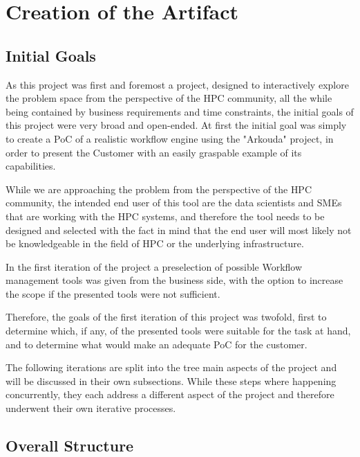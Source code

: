 \chapter{Creation of the Artifact}
\label{creation_of_the_artifact}

\section{Initial Goals}
\label{artefact_inital_goals}

As this project was first and foremost a project, designed to interactively explore the problem space from the perspective of the \ac{HPC} community, 
all the while being contained by business requirements and time constraints, the initial goals of this project were very broad and open-ended. 
At first the initial goal was simply to create a \ac{PoC} of a realistic workflow engine using the "Arkouda" project,
in order to present the Customer with an easily graspable example of its capabilities.

While we are approaching the problem from the perspective of the \ac{HPC} community, the intended end user of this tool are the data scientists and \acp{SME}
that are working with the \ac{HPC} systems, and therefore the tool needs to be designed and selected with the fact in mind that the end user will most likely not be knowledgeable in the field of \ac{HPC} or the underlying infrastructure.

In the first iteration of the project a preselection of possible Workflow management tools was given from the business side,
with the option to increase the scope if the presented tools were not sufficient.

Therefore, the goals of the first iteration of this project was twofold, first to determine which, if any, of the presented tools were suitable for the task at hand,
and to determine what would make an adequate \ac{PoC} for the customer.

The following iterations are split into the tree main aspects of the project and will be discussed in their own subsections.
While these steps where happening concurrently, they each address a different aspect of the project and therefore underwent their own iterative processes.


\section{Overall Structure}
 
